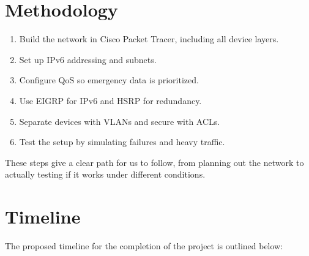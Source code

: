 \documentclass[12pt,a4paper]{article}
\begin{document}
\vspace{1em}

\section*{Methodology}
\begin{enumerate}[label=6.\arabic*, nosep]
    \item Build the network in Cisco Packet Tracer, including all device layers.
    \item Set up IPv6 addressing and subnets.
    \item Configure QoS so emergency data is prioritized.
    \item Use EIGRP for IPv6 and HSRP for redundancy.
    \item Separate devices with VLANs and secure with ACLs.
    \item Test the setup by simulating failures and heavy traffic.
\end{enumerate}
These steps give a clear path for us to follow, from planning out the network to actually testing if it works under different conditions.


\newpage
{}
\section*{Timeline}

The proposed timeline for the completion of the project is outlined below:

\vspace{1em}
\renewcommand{\arraystretch}{1.2}
\setlength{\extrarowheight}{4pt}
\end{document}
